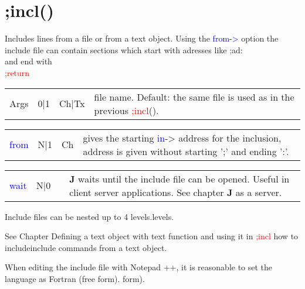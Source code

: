 \section{;incl()}
\label{incl}
 Includes lines from a file or from a text object. Using the \textcolor{blue}{from->}
option the include file can contain sections which start with adresses like
 ;ad: \\
and end with \\
\textcolor{Red}{;return}
\begin{table}[H]
\begin{tabular}{ m{}  m{}m{}p{}}
 Args & 0|1 & Ch|Tx &  file name. Default: the same file is used as in the previous \textcolor{Red}{;incl}().
\\ \cline{1-4}
\end{tabular}
\end{table}
\vspace{-1.51em}
\begin{table}[H]
\begin{tabular}{ m{}  m{}m{}p{}}
\textcolor{blue}{from} & N|1 & Ch &gives the starting \textcolor{blue}{in}-> address for the inclusion, address is given without starting ';'
 and ending ':'.
\\ \cline{1-4}
\end{tabular}
\end{table}
\vspace{-1.51em}
\begin{table}[H]
\begin{tabular}{ m{}  m{}m{}p{}}
\textcolor{blue}{wait}& N|0 & & \textbf{J} waits until the include file can be opened. Useful in client server applications.
 See chapter \textbf{J} as a server.
\\ \cline{1-4}
\end{tabular}
\end{table}
\begin{note}
Include files can be nested up to 4 levels.levels.
\end{note}
\begin{note}
See Chapter Defining a text object with text function and using it in \textcolor{Red}{;incl} how to includeinclude
 commands from a text object.
\end{note}
\begin{note}
When editing the include file with Notepad ++, it is reasonable to set the language as Fortran (free form). form).
\end{note}
